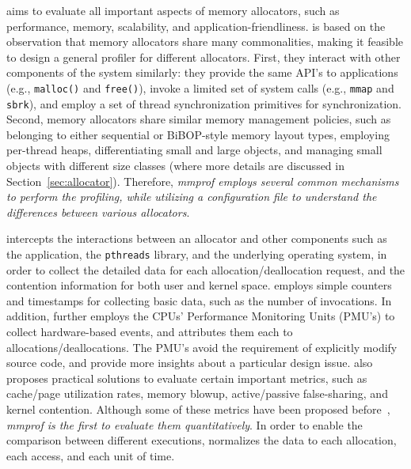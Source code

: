 \MP{} aims to evaluate all important aspects of memory allocators, such as performance, memory, scalability, and application-friendliness. \MP{} is based on the observation that memory allocators share many commonalities, making it feasible to design a general profiler for different allocators. First, they interact with other components of the system similarly: they provide the same API's to applications (e.g., \texttt{malloc()} and \texttt{free()}), invoke a limited set of system calls (e.g., \texttt{mmap} and \texttt{sbrk}), and employ a set of thread synchronization primitives for synchronization. Second, memory allocators share similar memory management policies, such as belonging to either sequential or BiBOP-style memory layout types, employing per-thread heaps, differentiating small and large objects, and managing small objects with different size classes (where more details are discussed in Section~\ref{sec:allocator}). Therefore, \textit{mmprof employs several common mechanisms to perform the profiling, while utilizing a configuration file to understand the differences between various allocators}.    

\MP{} intercepts the interactions between an allocator and other components such as the application, the \texttt{pthreads} library, and the underlying operating system, in order to collect the detailed data for each allocation/deallocation request, and the contention information for both user and kernel space. 
 \MP{} employs simple counters and timestamps for collecting basic data, such as the number of invocations. In addition, \MP{} further employs the CPUs' Performance Monitoring Units (PMU's) to collect hardware-based events, and attributes them each to allocations/deallocations. The PMU's avoid the requirement of explicitly modify source code, and provide more insights about a particular design issue. \MP{} also proposes practical solutions to evaluate certain important metrics, such as cache/page utilization rates, memory blowup, active/passive false-sharing, and kernel contention. Although some of these metrics have been proposed before~\cite{Hoard}, \textit{mmprof is the first to evaluate them quantitatively}. In order to enable the comparison between different executions, \MP{} normalizes the data to each allocation, each access, and each unit of time.  


